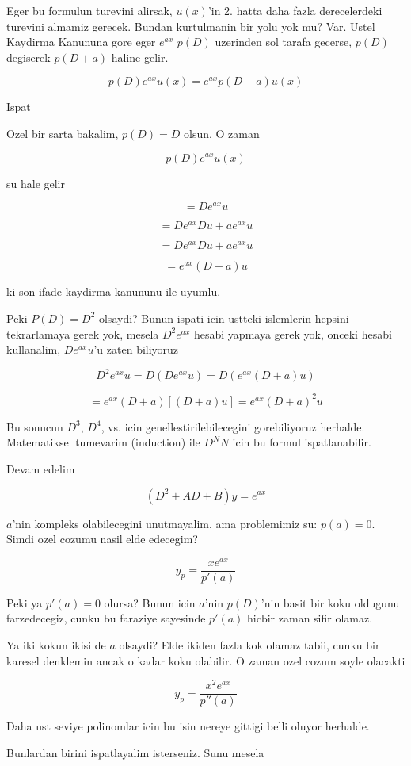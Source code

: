 \documentclass[12pt,fleqn]{article}\usepackage{../common}
\begin{document}
Eger bu formulun turevini alirsak, $u(x)$'in 2. hatta daha fazla
derecelerdeki turevini almamiz gerecek. Bundan kurtulmanin bir yolu yok mu?
Var. Ustel Kaydirma Kanununa gore eger $e^{ax}$ $p(D)$ uzerinden sol tarafa
gecerse, $p(D)$ degiserek $p(D+a)$ haline gelir. 

\[ p(D)e^{ax}u(x) = e^{ax}p(D+a)u(x)\]

Ispat

Ozel bir sarta bakalim, $p(D) = D$ olsun. O zaman 

\[ p(D)e^{ax}u(x) \]

su hale gelir

\[ = De^{ax}u\]

\[ = De^{ax}Du + ae^{ax}u \]

\[ = De^{ax}Du + ae^{ax}u \]

\[ = e^{ax}(D + a)u \]

ki son ifade kaydirma kanununu ile uyumlu. 

Peki $P(D) = D^2$ olsaydi? Bunun ispati icin ustteki islemlerin hepsini
tekrarlamaya gerek yok, mesela $D^2e^{ax}$ hesabi yapmaya gerek yok,
onceki hesabi kullanalim, $De^{ax}u$'u zaten biliyoruz

\[  D^2e^{ax}u = D(De^{ax}u) = D(e^{ax}(D+a)u)  \]

\[ = e^{ax}(D+a)[(D+a)u] = e^{ax}(D+a)^2u \]

Bu sonucun $D^3$, $D^4$, vs. icin genellestirilebilecegini gorebiliyoruz
herhalde. Matematiksel tumevarim (induction) ile $D^NN$ icin bu formul
ispatlanabilir. 

Devam edelim

\[ (D^2+AD+B)y = e^{ax} \]

$a$'nin kompleks olabilecegini unutmayalim, ama problemimiz su: $p(a) =
0$.
Simdi ozel cozumu nasil elde edecegim? 

\[ y_p = \frac{x e^{ax}}{p'(a)} \]

Peki ya $p'(a) = 0$  olursa? Bunun icin $a$'nin $p(D)$'nin basit bir koku
oldugunu farzedecegiz, cunku bu faraziye sayesinde $p'(a)$ hicbir zaman
sifir olamaz. 

Ya iki kokun ikisi de $a$ olsaydi? Elde ikiden fazla kok olamaz tabii,
cunku bir karesel denklemin ancak o kadar koku olabilir. O zaman ozel cozum
soyle olacakti

\[ y_p = \frac{x^2e^{ax}}{p''(a)} \]

Daha ust seviye polinomlar icin bu isin nereye gittigi belli oluyor
herhalde. 

Bunlardan birini ispatlayalim isterseniz. Sunu mesela
\end{document}
